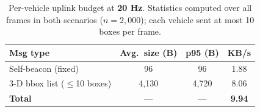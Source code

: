 \begin{table}[t]
\footnotesize
\centering
\caption{Per-vehicle uplink budget at \textbf{20 Hz}.
         Statistics computed over all frames in both scenarios
         (\(n\!=\!2{,}000\)); each vehicle sent at most 10 boxes per frame.}
\label{tab:bandwidth}
\begin{tabularx}{\linewidth}{@{}lccc@{}}
\toprule
\textbf{Msg type} & \textbf{Avg.\ size (B)} & \textbf{p95 (B)} & \textbf{KB/s}\\
\midrule
Self-beacon (fixed)        & 96   & 96    & 1.88 \\
3-D bbox list ($\leq$10 boxes)  & 4,130 & 4,720 & 8.06 \\
\midrule
\textbf{Total}             & —    & —     & \textbf{9.94} \\
\bottomrule
\end{tabularx}
\end{table}